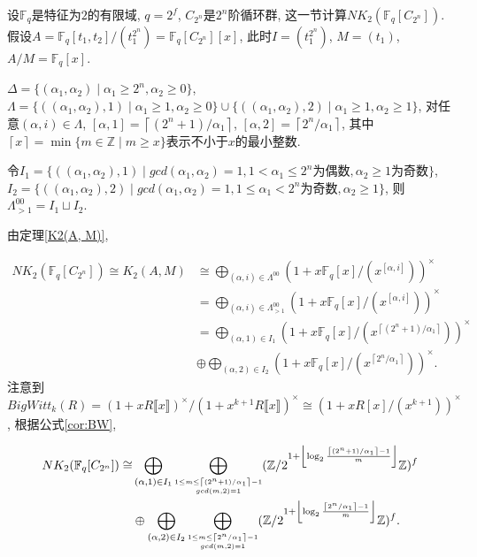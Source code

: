 设$\mathbb{F}_q$是特征为$2$的有限域, $q=2^f$, $C_{2^n}$是$2^n$阶循环群, 这一节计算$NK_2(\mathbb{F}_q[C_{2^n}])$. 假设$A=\mathbb{F}_q[t_1, t_2]/(t_1^{2^n})=\mathbb{F}_q[C_{2^n}][x]$, 此时$I=(t_1^{2^n})$, $M=(t_1)$, $A/M=\mathbb{F}_q[x]$. 

\begin{lemma}
	$\Delta =\{(\alpha_1, \alpha_2)\mid \alpha_1\geq 2^n, \alpha_2 \geq 0\}$, $\Lambda = \{((\alpha_1, \alpha_2), 1) \mid \alpha_1\geq 1, \alpha_2\geq 0\}\cup \{((\alpha_1, \alpha_2), 2) \mid \alpha_1\geq 1, \alpha_2\geq 1\}$, 对任意$(\alpha, i)\in \Lambda$, $[\alpha, 1]=\left \lceil (2^n+1)/\alpha_1 \right \rceil$, $[\alpha, 2]=\left \lceil 2^n/\alpha_1 \right \rceil$, 其中$\left \lceil x \right \rceil=\min \{m\in \mathbb{Z}\mid  m\geq x\}$表示不小于$x$的最小整数. 
\end{lemma}

\begin{lemma}
令$I_1 =\{((\alpha_1, \alpha_2), 1)\mid gcd(\alpha_1, \alpha_2)=1, 1< \alpha_1\leq 2^n\text{为偶数}, \alpha_2\geq 1\text{为奇数}\}$, $I_2=\{((\alpha_1, \alpha_2), 2)\mid gcd(\alpha_1, \alpha_2)=1, 1\leq \alpha_1<2^n\text{为奇数}, \alpha_2\geq 1\}$, 则$\Lambda^{00}_{>1}=I_1\sqcup I_2$. 
\end{lemma}
由定理\ref{K2(A, M)}, 

\begin{align*}
NK_2(\mathbb{F}_q[C_{2^n}])\cong K_2(A, M) &\cong \bigoplus_{(\alpha, i)\in\Lambda^{00}}(1+x\mathbb{F}_q[x]/(x^{[\alpha, i]}))^{\times}\\
& = \bigoplus_{(\alpha, i)\in \Lambda^{00}_{>1}}(1+x\mathbb{F}_q[x]/(x^{[\alpha, i]}))^{\times}\\
& = \bigoplus_{(\alpha, 1)\in I_1}(1+x\mathbb{F}_q[x]/(x^{\left \lceil (2^n+1)/\alpha_1 \right \rceil}))^{\times} \\
& \oplus \bigoplus_{(\alpha, 2)\in I_2}(1+x\mathbb{F}_q[x]/(x^{\left \lceil 2^n/\alpha_1 \right \rceil}))^{\times}. 
\end{align*}
注意到$BigWitt_{k}(R)=(1+x R\llbracket x\rrbracket )^{\times}/(1+x^{k+1} R\llbracket x\rrbracket )^{\times} \cong (1+x R[x]/(x^{k+1}))^{\times}$, 
根据公式\ref{cor:BW}, 

\begin{align*}
NK_2(\mathbb{F}_q[C_{2^n}])\cong & \bigoplus_{(\alpha, 1)\in I_1}\bigoplus_{\scriptsize\substack{1\leq m\leq \left \lceil (2^n+1)/\alpha_1 \right \rceil-1 \\ gcd(m, 2)=1}}(\mathbb{Z}/2^{1+ \left \lfloor\log_2 \frac{\left \lceil (2^n+1)/\alpha_1 \right \rceil-1}{m}  \right \rfloor}\mathbb{Z})^f \\
& \oplus \bigoplus_{(\alpha, 2)\in I_2}\bigoplus_{\scriptsize\substack{ 1 \leq m\leq \left \lceil 2^n/\alpha_1 \right \rceil-1 \\ gcd(m, 2)=1}}(\mathbb{Z}/2^{1+ \left \lfloor\log_2 \frac{\left \lceil 2^n/\alpha_1 \right \rceil-1}{m}  \right \rfloor}\mathbb{Z})^f. 
\end{align*}

